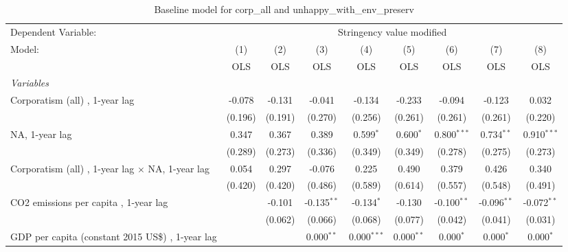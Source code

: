 
\begin{table}[htbp]
   \caption{Baseline model for corp\_all and unhappy\_with\_env\_preserv}
   \centering
   \begin{tabular}{lcccccccc}
      \toprule
      Dependent Variable: & \multicolumn{8}{c}{Stringency value modified}\\
      Model:                                                  & (1)     & (2)     & (3)           & (4)           & (5)          & (6)           & (7)           & (8)\\  
                                                              &  OLS    & OLS     & OLS           & OLS           & OLS          & OLS           & OLS           & OLS\\  
      \midrule
      \emph{Variables}\\
      Corporatism (all) , 1-year lag                          & -0.078  & -0.131  & -0.041        & -0.134        & -0.233       & -0.094        & -0.123        & 0.032\\   
                                                              & (0.196) & (0.191) & (0.270)       & (0.256)       & (0.261)      & (0.261)       & (0.261)       & (0.220)\\   
      NA, 1-year lag                                          & 0.347   & 0.367   & 0.389         & 0.599$^{*}$   & 0.600$^{*}$  & 0.800$^{***}$ & 0.734$^{**}$  & 0.910$^{***}$\\   
                                                              & (0.289) & (0.273) & (0.336)       & (0.349)       & (0.349)      & (0.278)       & (0.275)       & (0.273)\\   
      Corporatism (all) , 1-year lag $\times$ NA, 1-year lag  & 0.054   & 0.297   & -0.076        & 0.225         & 0.490        & 0.379         & 0.426         & 0.340\\   
                                                              & (0.420) & (0.420) & (0.486)       & (0.589)       & (0.614)      & (0.557)       & (0.548)       & (0.491)\\   
      CO2 emissions per capita , 1-year lag                   &         & -0.101  & -0.135$^{**}$ & -0.134$^{*}$  & -0.130       & -0.100$^{**}$ & -0.096$^{**}$ & -0.072$^{**}$\\   
                                                              &         & (0.062) & (0.066)       & (0.068)       & (0.077)      & (0.042)       & (0.041)       & (0.031)\\   
      GDP per capita (constant 2015 US\$) , 1-year lag        &         &         & 0.000$^{**}$  & 0.000$^{***}$ & 0.000$^{**}$ & 0.000$^{*}$   & 0.000$^{*}$   & 0.000$^{*}$\\   

\end{tabular}
\end{table}
